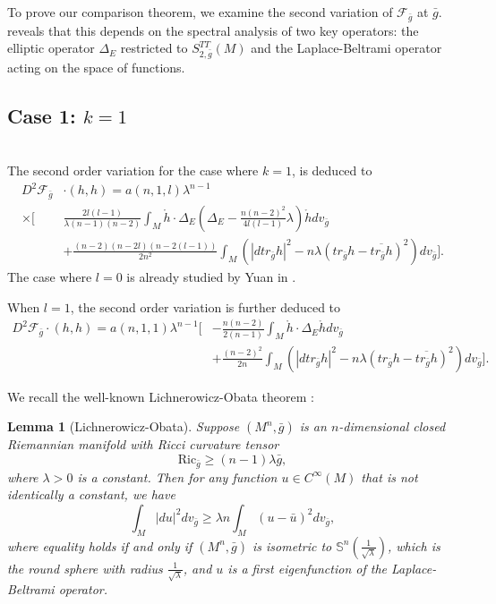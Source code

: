\documentclass[12pt]{amsart}
\newtheorem{lemma}{Lemma}[section]
\newcommand{\bg}{\bar{g}}
\numberwithin{equation}{section}
\begin{document}
To prove our comparison theorem, we examine the second variation of $\mathcal{F}_{\bg}$ at $\bg$.  reveals that this depends on the spectral analysis of two key operators: the elliptic operator $\Delta_E$ restricted to $S_{2,\bg}^{TT}(M)$ and the Laplace-Beltrami operator acting on the space of functions.
\subsection{Case 1: $k=1$}\label{Subsection: 4.1}
~\\
The second order variation for the case where $k=1$, is deduced to
\begin{equation*}
    \begin{split}
    D^2\mathcal{F}_{\bg}&\cdot(h,h)= a(n,1,l)\lambda^{n-1}\\
    \times\Bigg[&\frac{2l(l-1)}{\lambda(n-1)(n-2)}\int_M \mathring{h} \cdot \Delta_E\left(\Delta_E-\frac{n(n-2)^2}{4l(l-1)}\lambda\right) \mathring{h} dv_{\bg}\\
    & +\frac{(n-2)(n-2l)\left(n-2(l-1)\right)}{2n^2} \int_M \left( \left| dtr_{\bg}h \right|^2-n \lambda(tr_{\bg}h - \overline{tr_{\bg}h})^2 \right) dv_{\bg} \Bigg].
    \end{split}
\end{equation*}
The case where $l=0$ is already studied by Yuan in .

When $l=1$, the second order variation is further deduced to
\begin{equation*}
    \begin{split}
    D^2\mathcal{F}_{\bg}\cdot(h,h)= a(n,1,1)\lambda^{n-1}\Bigg[&-\frac{n(n-2)}{2(n-1)}\int_M \mathring{h} \cdot \Delta_E \mathring{h} dv_{\bg}\\
    & +\frac{(n-2)^2}{2n} \int_M \left( \left| dtr_{\bg}h \right|^2-n \lambda(tr_{\bg}h - \overline{tr_{\bg}h})^2 \right) dv_{\bg} \Bigg].
    \end{split}
\end{equation*}

We recall the well-known Lichnerowicz-Obata theorem \cite{PeterLi}:
\begin{lemma}[Lichnerowicz-Obata]\label{Lemma: Lichnerowicz_Obata}
    Suppose $(M^n,\bg)$ is an $n$-dimensional closed Riemannian manifold with Ricci curvature tensor
    \begin{equation*}
        \mathrm{Ric}_{\bg} \geq (n-1)\lambda \bg,
    \end{equation*}
    where $\lambda>0$ is a constant. Then for any function $u\in C^{\infty}(M)$ that is not identically a constant, we have
    \begin{equation*}
        \int_M |du|^2 dv_{\bg} \geq \lambda n \int_M (u-\bar{u})^2 dv_{\bg},
    \end{equation*}
    where equality holds if and only if $(M^n,\bg)$ is isometric to $\mathbb{S}^n \left(\frac{1}{\sqrt{\lambda}}\right)$, which is the round sphere with radius $\frac{1}{\sqrt{\lambda}}$, and $u$ is a first eigenfunction of the Laplace-Beltrami operator.
\end{lemma}
\end{document}
